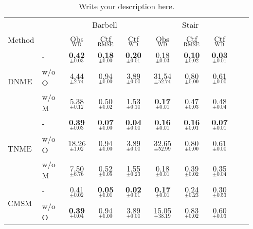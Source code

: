 
\begin{table}[t]
\caption{Write your description here.}
\label{sample-table}
\vskip 0.15in
\begin{center}
\begin{small}
\begin{sc}
\begin{tabular}{llcccccccc}
\toprule
 &  & \multicolumn{3}{c}{Barbell} & \multicolumn{3}{c}{Stair} \\
      \cmidrule(lr){3-5}                \cmidrule(lr){6-8}
Method &  & Obs$_{\text{WD}}$ & Ctf$_{\text{RMSE}}$ & Ctf$_{\text{WD}}$ & Obs$_{\text{WD}}$ & Ctf$_{\text{RMSE}}$ & Ctf$_{\text{WD}}$ \\
\midrule
\multirow{3}{*}{DNME} & -     & \textbf{0.42}$_{\pm \mathbf{0.03}}$ & \textbf{0.18}$_{\pm \mathbf{0.00}}$ & \textbf{0.20}$_{\pm \mathbf{0.01}}$ & 0.18$_{\pm 0.03}$ & \textbf{0.10}$_{\pm \mathbf{0.02}}$ & \textbf{0.03}$_{\pm \mathbf{0.01}}$ & \\
                             & w/o O & 4.44$_{\pm 2.74}$ & 0.94$_{\pm 0.00}$ & 3.89$_{\pm 0.00}$ & 31.54$_{\pm 52.74}$ & 0.80$_{\pm 0.00}$ & 0.61$_{\pm 0.00}$ & \\
                             & w/o M & 5.38$_{\pm 0.12}$ & 0.50$_{\pm 0.02}$ & 1.53$_{\pm 0.10}$ & \textbf{0.17}$_{\pm \mathbf{0.01}}$ & 0.47$_{\pm 0.03}$ & 0.48$_{\pm 0.04}$ & \\
\midrule
\multirow{3}{*}{TNME} & -     & \textbf{0.39}$_{\pm \mathbf{0.03}}$ & \textbf{0.07}$_{\pm \mathbf{0.00}}$ & \textbf{0.04}$_{\pm \mathbf{0.00}}$ & \textbf{0.16}$_{\pm \mathbf{0.01}}$ & \textbf{0.16}$_{\pm \mathbf{0.01}}$ & \textbf{0.07}$_{\pm \mathbf{0.01}}$ & \\
                             & w/o O & 18.26$_{\pm 1.02}$ & 0.94$_{\pm 0.00}$ & 3.89$_{\pm 0.00}$ & 32.65$_{\pm 52.99}$ & 0.80$_{\pm 0.00}$ & 0.61$_{\pm 0.00}$ & \\
                             & w/o M & 7.50$_{\pm 6.76}$ & 0.52$_{\pm 0.05}$ & 1.55$_{\pm 0.23}$ & 0.18$_{\pm 0.01}$ & 0.39$_{\pm 0.02}$ & 0.35$_{\pm 0.04}$ & \\
\midrule
\multirow{4}{*}{CMSM} & -     & 0.41$_{\pm 0.02}$ & \textbf{0.05}$_{\pm \mathbf{0.01}}$ & \textbf{0.02}$_{\pm \mathbf{0.01}}$ & \textbf{0.17}$_{\pm \mathbf{0.01}}$ & 0.24$_{\pm 0.23}$ & 0.30$_{\pm 0.53}$ & \\
                             & w/o O & \textbf{0.39}$_{\pm \mathbf{0.04}}$ & 0.94$_{\pm 0.00}$ & 3.89$_{\pm 0.00}$ & 15.05$_{\pm 38.19}$ & 0.83$_{\pm 0.02}$ & 0.60$_{\pm 0.03}$ & \\

\end{tabular}
\end{sc}
\end{small}
\end{center}
\end{table}
